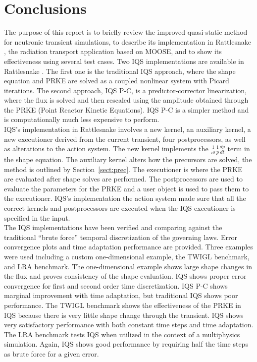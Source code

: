 \documentclass[12pt]{scrartcl}
\newcommand{\rattlesnake}{Rattlesnake }
\newcommand{\sct}[1]{Section~\ref{#1}}                   %
\begin{document}
\section{Conclusions}

The purpose of this report is to briefly review the improved quasi-static method for neutronic transient simulations, to describe its implementation in \rattlesnake, the radiation transport application based on MOOSE, and to show its effectiveness using several test cases.  
Two IQS implementations are available in \rattlesnake.  The first one is the traditional IQS approach, where the shape equation and PRKE are solved as a coupled nonlinear system with Picard iterations.  The second approach, IQS P-C, is a predictor-corrector linearization, where the flux is solved and then rescaled using the amplitude obtained through the PRKE
(Point Reactor Kinetic Equations).  IQS P-C is a simpler method and is computationally much less expensive to perform. \\

IQS's implementation in \rattlesnake involves a new kernel, an auxiliary kernel, a new executioner derived from the current transient, four postprocessors, as well as alterations to the action system.  The new kernel implements the $\frac{1}{v^g}\frac{1}{p}\frac{dp}{dt}$ term in the shape equation.  The auxiliary kernel alters how the precursors are solved, the method is outlined by \sct{sect:prec}.  The executioner is where the PRKE are evaluated after shape solves are performed.  The postprocessors are used to evaluate the parameters for the PRKE and a user object is used to pass them to the executioner.  IQS's implementation the action system made sure that all the correct kernels and postprocessors are executed when the IQS executioner is specified in the input. \\

The IQS implementations have been verified and comparing against the traditional ``brute force'' temporal discretization of the governing laws. Error convergence plots and time adaptation performance are provided.  Three examples were used including a custom one-dimensional example, the TWIGL benchmark, and LRA benchmark.  The one-dimensional example shows large shape changes in the flux and proves consistency of the shape evaluation. IQS shows proper error convergence for first and second order time discretization. IQS P-C shows marginal improvement with time adaptation, but traditional IQS shows poor performance.  The TWIGL benchmark shows the effectiveness of the PRKE in IQS because there is very little shape change through the transient.  IQS shows very satisfactory performance with both constant time steps and time adaptation.  The LRA benchmark tests IQS when utilized in the context of a multiphysics simulation.  Again, IQS shows good performance by requiring half the time steps as brute force for a given error.
\end{document}
